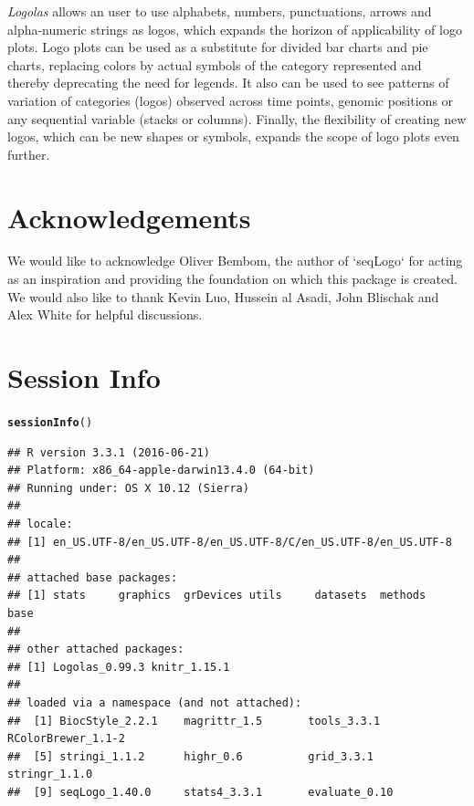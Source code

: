 \documentclass[12pt]{article}\usepackage[]{graphicx}\usepackage[usenames,dvipsnames]{color}
\makeatletter
\newcommand{\hlstd}[1]{\textcolor[rgb]{0.345,0.345,0.345}{#1}}%
\newcommand{\hlkwd}[1]{\textcolor[rgb]{0.737,0.353,0.396}{\textbf{#1}}}%
\newenvironment{kframe}{%
 \def\at@end@of@kframe{}%
 \ifinner\ifhmode%
  \def\at@end@of@kframe{\end{minipage}}%
  \begin{minipage}{\columnwidth}%
 \fi\fi%
 \def\FrameCommand##1{\hskip\@totalleftmargin \hskip-\fboxsep
 \colorbox{shadecolor}{##1}\hskip-\fboxsep
     \hskip-\linewidth \hskip-\@totalleftmargin \hskip\columnwidth}%
 \MakeFramed {\advance\hsize-\width
   \@totalleftmargin\z@ \linewidth\hsize
   \@setminipage}}%
 {\par\unskip\endMakeFramed%
 \at@end@of@kframe}
\newenvironment{knitrout}{}{} %
\newcommand{\Logolas}{\textit{Logolas}}
\makeatother
\begin{document}
\Logolas{} allows an user to use alphabets, numbers, punctuations, arrows and alpha-numeric strings as logos, which expands the horizon of applicability of logo plots. Logo plots can be used as a substitute for divided bar charts and pie charts, replacing colors by actual symbols of the category represented and thereby deprecating the need for legends. It also can be used to see patterns of variation of categories (logos) observed across time points, genomic positions or any sequential variable (stacks or columns). Finally, the flexibility of creating new logos, which can be new shapes or symbols, expands the scope of logo plots even further.

\section{Acknowledgements}

We would like to acknowledge Oliver Bembom, the author of `seqLogo` for acting as an inspiration and providing the foundation on which this package is created. We would also like to thank Kevin Luo, Hussein al Asadi, John Blischak and Alex White
for helpful discussions.

\section{Session Info}

\begin{knitrout}
\color{fgcolor}\begin{kframe}
\begin{alltt}
\hlkwd{sessionInfo}\hlstd{()}
\end{alltt}
\begin{verbatim}
## R version 3.3.1 (2016-06-21)
## Platform: x86_64-apple-darwin13.4.0 (64-bit)
## Running under: OS X 10.12 (Sierra)
## 
## locale:
## [1] en_US.UTF-8/en_US.UTF-8/en_US.UTF-8/C/en_US.UTF-8/en_US.UTF-8
## 
## attached base packages:
## [1] stats     graphics  grDevices utils     datasets  methods   base     
## 
## other attached packages:
## [1] Logolas_0.99.3 knitr_1.15.1  
## 
## loaded via a namespace (and not attached):
##  [1] BiocStyle_2.2.1    magrittr_1.5       tools_3.3.1        RColorBrewer_1.1-2
##  [5] stringi_1.1.2      highr_0.6          grid_3.3.1         stringr_1.1.0     
##  [9] seqLogo_1.40.0     stats4_3.3.1       evaluate_0.10
\end{verbatim}
\end{kframe}
\end{knitrout}
\end{document}
